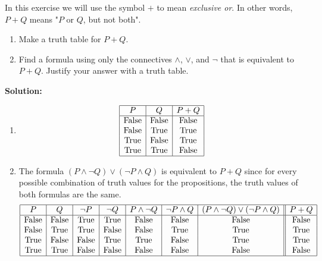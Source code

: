 In this exercise we will use the symbol $+$ to mean \textit{exclusive or}. In other words, $P+Q$ means "$P$ or $Q$, but not both".
\begin{enumerate}[label=(\alph*)]
    \item Make a truth table for $P + Q$.
    \item Find a formula using only the connectives $\wedge$, $\vee$, and $\neg$ that is equivalent to $P+Q$. Justify your answer with a truth table.
\end{enumerate}

\textbf{Solution:}
\begin{enumerate}[label=(\alph*)]
\item 
    \[
    \begin{array}{|c|c|c|}
    \hline
    P & Q & P + Q \\
    \hline
    \text{False} & \text{False} & \text{False} \\
    \text{False} & \text{True} & \text{True} \\
    \text{True} & \text{False} & \text{True} \\
    \text{True} & \text{True} & \text{False} \\
    \hline
    \end{array}
    \]

\item The formula $(P \wedge \neg Q) \vee (\neg P \wedge Q)$ is equivalent to $P + Q$ since for every possible combination of truth values for the propositions, the truth values of both formulas are the same. 
\[
\begin{array}{|c|c|c|c|c|c|c||c|}
\hline
P & Q & \neg P & \neg Q & P \wedge \neg Q & \neg P \wedge Q & (P \wedge \neg Q) \vee (\neg P \wedge Q) & P + Q \\
\hline
\text{False} & \text{False} & \text{True} & \text{True} & \text{False} & \text{False} & \text{False}& \text{False}\\
\text{False} & \text{True} & \text{True} & \text{False} & \text{False} & \text{True} & \text{True} & \text{True} \\
\text{True} & \text{False} & \text{False} & \text{True} & \text{True} & \text{False} & \text{True} & \text{True} \\
\text{True} & \text{True} & \text{False} & \text{False} & \text{False} & \text{False} & \text{False} & \text{False} \\
\hline
\end{array}
\]
\end{enumerate}

\pagebreak